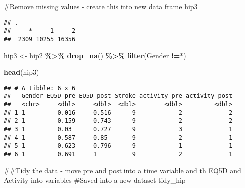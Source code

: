\documentclass[
]{article}
\newenvironment{Shaded}{\begin{snugshade}}{\end{snugshade}}
\newcommand{\FunctionTok}[1]{\textcolor[rgb]{0.13,0.29,0.53}{\textbf{#1}}}
\newcommand{\NormalTok}[1]{#1}
\newcommand{\OtherTok}[1]{\textcolor[rgb]{0.56,0.35,0.01}{#1}}
\newcommand{\SpecialCharTok}[1]{\textcolor[rgb]{0.81,0.36,0.00}{\textbf{#1}}}
\newcommand{\StringTok}[1]{\textcolor[rgb]{0.31,0.60,0.02}{#1}}
\begin{document}
\#Remove missing values - create this into new data frame hip3

\begin{Shaded}
\end{Shaded}

\begin{verbatim}
## .
##     *     1     2 
##  2309 10255 16356
\end{verbatim}

\begin{Shaded}
\begin{Highlighting}[]
\NormalTok{hip3 }\OtherTok{\textless{}{-}}\NormalTok{ hip2 }\SpecialCharTok{\%\textgreater{}\%} 
  \FunctionTok{drop\_na}\NormalTok{() }\SpecialCharTok{\%\textgreater{}\%} 
  \FunctionTok{filter}\NormalTok{(Gender }\SpecialCharTok{!=}\StringTok{\textquotesingle{}*\textquotesingle{}}\NormalTok{)}

\FunctionTok{head}\NormalTok{(hip3)}
\end{Highlighting}
\end{Shaded}

\begin{verbatim}
## # A tibble: 6 x 6
##   Gender EQ5D_pre EQ5D_post Stroke activity_pre activity_post
##   <chr>     <dbl>     <dbl>  <dbl>        <dbl>         <dbl>
## 1 1        -0.016     0.516      9            2             2
## 2 1         0.159     0.743      9            2             2
## 3 1         0.03      0.727      9            3             1
## 4 1         0.587     0.85       9            2             1
## 5 1         0.623     0.796      9            1             1
## 6 1         0.691     1          9            2             1
\end{verbatim}

\#\#Tidy the data - move pre and post into a time variable and th EQ5D
and Activity into variables \#Saved into a new dataset tidy\_hip
\end{document}
